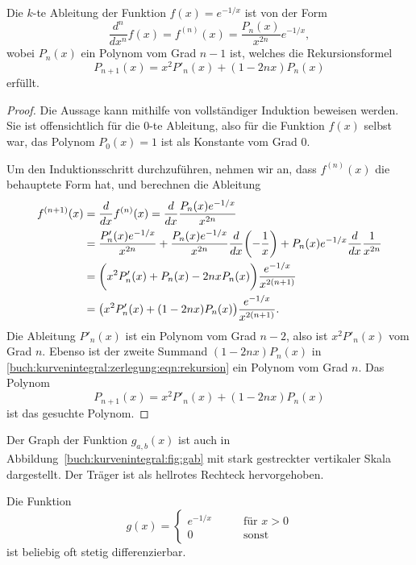 %

\begin{satz}
Die $k$-te Ableitung der Funktion $f(x)=e^{-1/x}$ ist von der Form
\[
\frac{d^n}{dx^n}f(x)
=
f^{(n)}(x)
=
\frac{P_n(x)}{x^{2n}}e^{-1/x},
\]
wobei $P_n(x)$ ein Polynom vom Grad $n-1$ ist, welches die
Rekursionsformel
\[
P_{n+1}(x)
=
x^2P'_n(x) + (1-2nx)P_n(x)
\]
erfüllt.
\end{satz}

\begin{proof}
Die Aussage kann mithilfe von vollständiger Induktion beweisen
werden.
Sie ist offensichtlich für die $0$-te Ableitung, also für die Funktion
$f(x)$ selbst war, das Polynom $P_0(x)=1$ ist als Konstante vom Grad 0.

Um den Induktionsschritt durchzuführen, nehmen wir an, dass $f^{(n)}(x)$
die behauptete Form hat, und berechnen die Ableitung
\begin{align}
f^{(n+1)}(x)
&=
\frac{d}{dx}
f^{(n)}(x)
=
\frac{d}{dx}
\frac{P_n(x) e^{-1/x}}{x^{2n}}
\notag
\\
&=
\frac{P'_n(x)e^{-1/x}}{x^{2n}}
+
\frac{P_n(x)e^{-1/x}}{x^{2n}}\frac{d}{dx}\biggl(-\frac1x\biggr)
+
P_n(x)e^{-1/x}\frac{d}{dx}\frac{1}{x^{2n}}
\notag
\\
&=
\biggl(
x^2 P'_n(x)
+
P_n(x)
-
2nx P_n(x)
\biggr)\frac{e^{-1/x}}{x^{2(n+1)}}
\notag
\\
&=
\bigl(x^2P'_n(x)+(1-2nx)P_n(x)\bigr) \frac{e^{-1/x}}{x^{2(n+1)}}.
\label{buch:kurvenintegral:zerlegung:eqn:rekursion}
\end{align}
Die Ableitung $P'_n(x)$ ist ein Polynom vom Grad $n-2$, also ist
$x^2P'_n(x)$ vom Grad $n$.
Ebenso ist der zweite Summand $(1-2nx)P_n(x)$ in
\eqref{buch:kurvenintegral:zerlegung:eqn:rekursion}
ein Polynom vom Grad $n$.
Das Polynom
\[
P_{n+1}(x)
=
x^2P'_{n}(x)+(1-2nx)P_n(x)
\]
ist das gesuchte Polynom.
\end{proof}

Der Graph der Funktion $g_{a,b}(x)$ ist auch in
Abbildung~\ref{buch:kurvenintegral:fig:gab}
mit stark gestreckter vertikaler Skala dargestellt.
Der Träger ist als hellrotes Rechteck hervorgehoben.

\begin{satz}
\label{buch:kurvenintegral:zerlegung:satz:g}
Die Funktion
\[
g(x)
=
\begin{cases}
e^{-1/x}&\qquad\text{für $x>0$}\\
0&\qquad\text{sonst}
\end{cases}
\]
ist beliebig oft stetig differenzierbar.
\end{satz}

